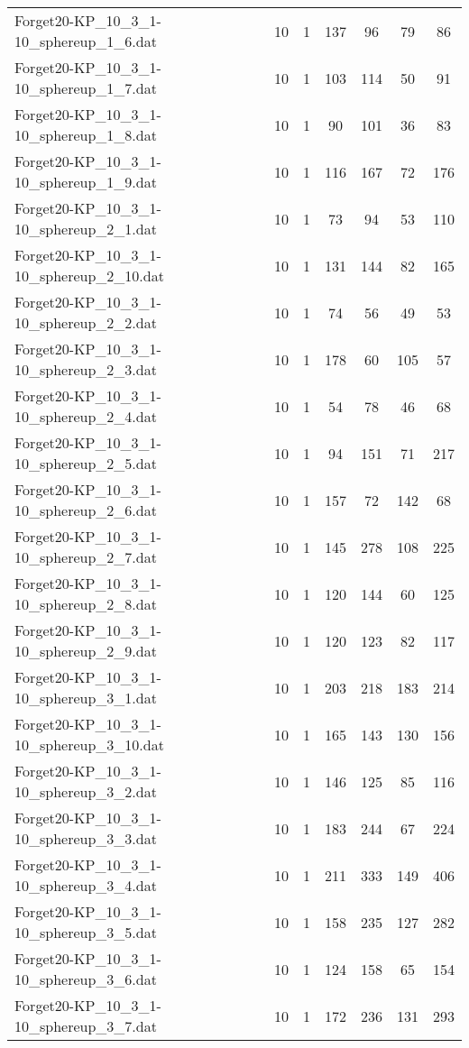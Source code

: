 \begin{table}[!ht]
\begin{tabular}{lcccccc}
Forget20-KP\_10\_3\_1-10\_sphereup\_1\_6.dat & 10 & 1 & 137 & 96 & 79 & 86 \\
Forget20-KP\_10\_3\_1-10\_sphereup\_1\_7.dat & 10 & 1 & 103 & 114 & 50 & 91 \\
Forget20-KP\_10\_3\_1-10\_sphereup\_1\_8.dat & 10 & 1 & 90 & 101 & 36 & 83 \\
Forget20-KP\_10\_3\_1-10\_sphereup\_1\_9.dat & 10 & 1 & 116 & 167 & 72 & 176 \\
Forget20-KP\_10\_3\_1-10\_sphereup\_2\_1.dat & 10 & 1 & 73 & 94 & 53 & 110 \\
Forget20-KP\_10\_3\_1-10\_sphereup\_2\_10.dat & 10 & 1 & 131 & 144 & 82 & 165 \\
Forget20-KP\_10\_3\_1-10\_sphereup\_2\_2.dat & 10 & 1 & 74 & 56 & 49 & 53 \\
Forget20-KP\_10\_3\_1-10\_sphereup\_2\_3.dat & 10 & 1 & 178 & 60 & 105 & 57 \\
Forget20-KP\_10\_3\_1-10\_sphereup\_2\_4.dat & 10 & 1 & 54 & 78 & 46 & 68 \\
Forget20-KP\_10\_3\_1-10\_sphereup\_2\_5.dat & 10 & 1 & 94 & 151 & 71 & 217 \\
Forget20-KP\_10\_3\_1-10\_sphereup\_2\_6.dat & 10 & 1 & 157 & 72 & 142 & 68 \\
Forget20-KP\_10\_3\_1-10\_sphereup\_2\_7.dat & 10 & 1 & 145 & 278 & 108 & 225 \\
Forget20-KP\_10\_3\_1-10\_sphereup\_2\_8.dat & 10 & 1 & 120 & 144 & 60 & 125 \\
Forget20-KP\_10\_3\_1-10\_sphereup\_2\_9.dat & 10 & 1 & 120 & 123 & 82 & 117 \\
Forget20-KP\_10\_3\_1-10\_sphereup\_3\_1.dat & 10 & 1 & 203 & 218 & 183 & 214 \\
Forget20-KP\_10\_3\_1-10\_sphereup\_3\_10.dat & 10 & 1 & 165 & 143 & 130 & 156 \\
Forget20-KP\_10\_3\_1-10\_sphereup\_3\_2.dat & 10 & 1 & 146 & 125 & 85 & 116 \\
Forget20-KP\_10\_3\_1-10\_sphereup\_3\_3.dat & 10 & 1 & 183 & 244 & 67 & 224 \\
Forget20-KP\_10\_3\_1-10\_sphereup\_3\_4.dat & 10 & 1 & 211 & 333 & 149 & 406 \\
Forget20-KP\_10\_3\_1-10\_sphereup\_3\_5.dat & 10 & 1 & 158 & 235 & 127 & 282 \\
Forget20-KP\_10\_3\_1-10\_sphereup\_3\_6.dat & 10 & 1 & 124 & 158 & 65 & 154 \\
Forget20-KP\_10\_3\_1-10\_sphereup\_3\_7.dat & 10 & 1 & 172 & 236 & 131 & 293 \\

\end{tabular}
\end{table}
